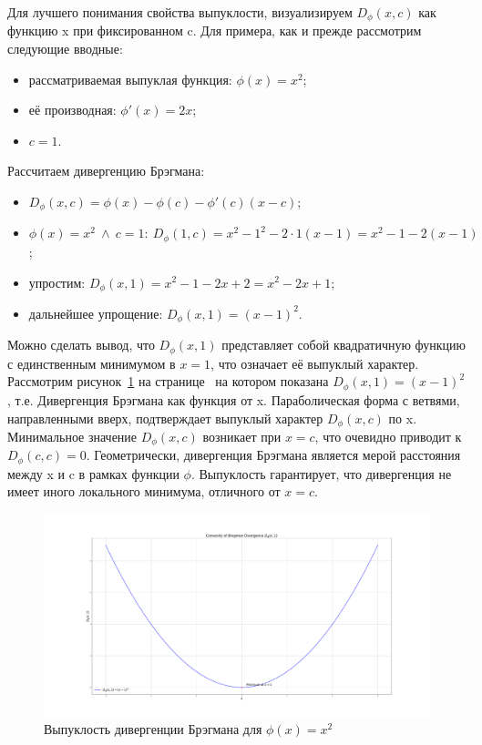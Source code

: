 \documentclass[12pt]{scrartcl}
\begin{document}
Для лучшего понимания свойства выпуклости, визуализируем $D_{\phi}(x,c)$ как функцию x при фиксированном c. Для примера, как и прежде рассмотрим следующие вводные:
\begin{itemize}
    \item рассматриваемая выпуклая функция: $\phi(x) = x^{2}$;
    \item её производная: $\phi'(x) = 2x$;
    \item $c = 1$.
\end{itemize}
Рассчитаем дивергенцию Брэгмана:
\begin{itemize}
    \item $D_{\phi}(x,c) = \phi(x) - \phi(c) - \phi'(c)(x-c)$;
    \item $\phi(x) = x^{2}\ \wedge\ c = 1:\ D_{\phi}(1,c) = x^{2} - 1^{2} - 2 \cdot 1 (x - 1) = x^{2} - 1 - 2(x - 1)$;
    \item упростим: $D_{\phi}(x,1) = x^{2} - 1 - 2x + 2 = x^{2} -2x +1$;
    \item дальнейшее упрощение: $D_{\phi}(x, 1) = (x - 1)^{2}$.
\end{itemize}
Можно сделать вывод, что $D_{\phi}(x, 1)$ представляет собой квадратичную функцию с единственным минимумом в $x = 1$, что означает её выпуклый характер. Рассмотрим рисунок~\ref{fig:convexity_1} на странице~\pageref{fig:convexity_1} на котором показана $D_{\phi}(x, 1) = (x - 1)^{2}$, т.е. Дивергенция Брэгмана как функция от x. Параболическая форма с ветвями, направленными вверх, подтверждает выпуклый характер $D_{\phi}(x,c)$ по x. Минимальное значение $D_{\phi}(x,c)$ возникает при $x = c$, что очевидно приводит к $D_{\phi}(c,c) = 0$. Геометрически, дивергенция Брэгмана является мерой расстояния между x и c в рамках функции $\phi$. Выпуклость гарантирует, что дивергенция не имеет иного локального минимума, отличного от $x = c$.

\begin{figure}[h]
    \centering
    \includegraphics[width=\textwidth]{convexity_1.pdf} %
    \caption{Выпуклость дивергенции Брэгмана для $\phi(x) = x^{2}$}
    \label{fig:convexity_1}
\end{figure}
\end{document}
